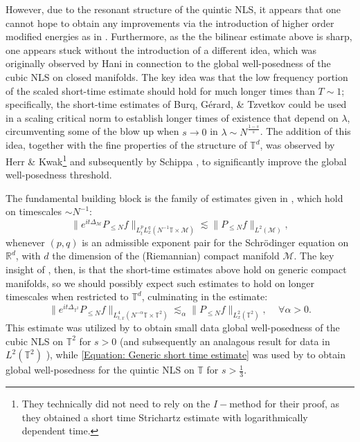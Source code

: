 \documentclass[12pt, letterpaper]{amsart}
\begin{document}
However, due to the resonant structure of the quintic NLS, it appears that one cannot hope to obtain any improvements via the introduction of higher order modified energies as in \cite{colliander2003sharp}. Furthermore, as the the bilinear estimate above is sharp, one appears stuck without the introduction of a different idea, which was originally observed by Hani \cite{HaniClosedGWPNLS} in connection to the global well-posedness of the cubic NLS on closed manifolds. The key idea was that the low frequency portion of the scaled short-time estimate should hold for much longer times than $T\sim 1$; specifically, the short-time estimates of Burq, G\'{e}rard, \& Tzvetkov \cite{BurqShortTime} could be used in a scaling critical norm to establish longer times of existence that depend on $\lambda$, circumventing some of the blow up when $s\to 0$ in $\lambda \sim N^\frac{1-s}{s}$. The addition of this idea, together with the fine properties of the structure of $\mathbb{T}^d$, was observed by Herr \& Kwak\footnote{They technically did not need to rely on the $I-$method for their proof, as they obtained a short time Strichartz estimate with logarithmically dependent time.} \cite{herr2023strichartz} and subsequently by Schippa \cite{schippa2024improved}, to significantly improve the global well-posedness threshold.

The fundamental building block is the family of estimates given in \cite{HaniClosedGWPNLS}, which hold on timescales $\sim N^{-1}$:
\begin{equation}\label{Equation: Generic short time estimate}
\|e^{it\Delta_\mathcal{M}}P_{\leq N} f\|_{L^p_tL^q_x(N^{-1}\mathbb{T}\times\mathcal{M})}\lesssim \|P_{\leq N} f\|_{L^2(\mathcal{M})},
\end{equation}
whenever $(p,q)$ is an admissible exponent pair for the Schr\"odinger equation on $\mathbb{R}^d$, with $d$ the dimension of the (Riemannian) compact manifold $\mathcal{M}$. The key insight of \cite{herr2023strichartz}, then, is that the short-time estimates above hold on generic compact manifolds, so we should possibly expect such estimates to hold on longer timescales when restricted to $\mathbb{T}^d$, culminating in the estimate:
\begin{equation}\label{Equation: Herr Short time estimate}
\|e^{it\Delta_{\mathbb{T}^2}}P_{\leq N} f\|_{L^4_{t,x}(N^{-\alpha}\mathbb{T}\times \mathbb{T}^2)}\lesssim_\alpha \|P_{\leq N} f\|_{L^2_x(\mathbb{T}^2)},\quad\,\forall\alpha > 0.
\end{equation}
This estimate was utilized by \cite{herr2023strichartz} to obtain small data global well-posedness of the cubic NLS on $\mathbb{T}^2$ for $s > 0$ (and subsequently an analagous result for data in $L^2(\mathbb{T}^2)$ \cite{herr2025global}), while \eqref{Equation: Generic short time estimate} was used by \cite{schippa2024improved} to obtain global well-posedness for the quintic NLS on $\mathbb{T}$ for $s > \frac13$.
\end{document}
